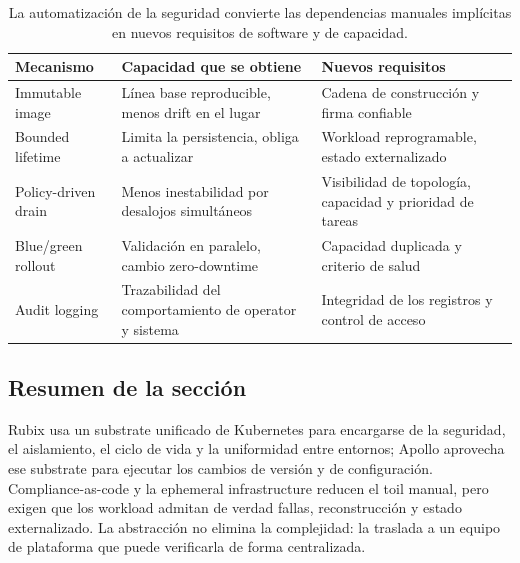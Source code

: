\begin{table}[H]
\centering
\begin{tabular}{L{0.19\textwidth}L{0.32\textwidth}L{0.39\textwidth}}
\toprule
Mecanismo & Capacidad que se obtiene & Nuevos requisitos \\
\midrule
Immutable image & Línea base reproducible, menos drift en el lugar & Cadena de construcción y firma confiable \\
Bounded lifetime & Limita la persistencia, obliga a actualizar & Workload reprogramable, estado externalizado \\
Policy-driven drain & Menos inestabilidad por desalojos simultáneos & Visibilidad de topología, capacidad y prioridad de tareas \\
Blue/green rollout & Validación en paralelo, cambio zero-downtime & Capacidad duplicada y criterio de salud \\
Audit logging & Trazabilidad del comportamiento de operator y sistema & Integridad de los registros y control de acceso \\
\bottomrule
\end{tabular}
\caption{La automatización de la seguridad convierte las dependencias manuales implícitas en nuevos requisitos de software y de capacidad.}
\end{table}

\subsection{Resumen de la sección}

Rubix usa un substrate unificado de Kubernetes para encargarse de la seguridad, el aislamiento, el ciclo de vida y la uniformidad entre entornos; Apollo aprovecha ese substrate para ejecutar los cambios de versión y de configuración. Compliance-as-code y la ephemeral infrastructure reducen el toil manual, pero exigen que los workload admitan de verdad fallas, reconstrucción y estado externalizado. La abstracción no elimina la complejidad: la traslada a un equipo de plataforma que puede verificarla de forma centralizada.
